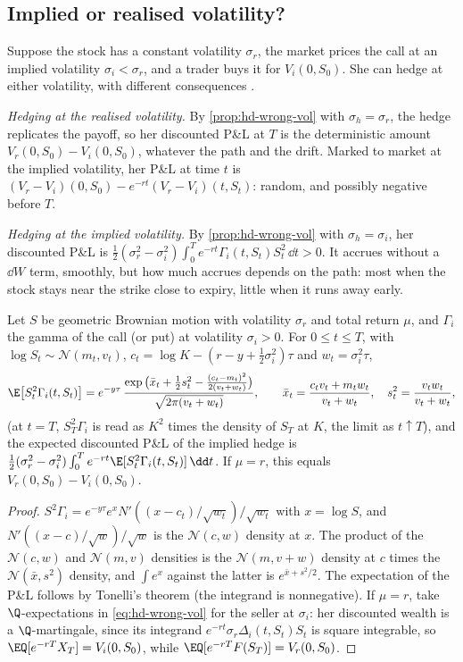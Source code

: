 \subsection{Implied or realised volatility?}\label{sec:hd-implied}

Suppose the stock has a constant volatility $\sigma_r$, the market prices the call at an
implied volatility $\sigma_i<\sigma_r$, and a trader buys it for $V_i(0,S_0)$. She can hedge at either
volatility, with different consequences \citep{ahmad-wilmott-2005}.

\emph{Hedging at the realised volatility.} By \cref{prop:hd-wrong-vol} with $\sigma_h=\sigma_r$, the
hedge replicates the payoff, so her discounted P\&L at $T$ is the deterministic amount
$V_r(0,S_0)-V_i(0,S_0)$, whatever the path and the drift. Marked to market at the implied
volatility, her P\&L at time $t$ is $(V_r-V_i)(0,S_0)-e^{-rt}(V_r-V_i)(t,S_t)$: random, and
possibly negative before $T$.

\emph{Hedging at the implied volatility.} By \cref{prop:hd-wrong-vol} with $\sigma_h=\sigma_i$, her
discounted P\&L is $\frac12(\sigma_r^2-\sigma_i^2)\int_0^Te^{-rt}\Gamma_i(t,S_t)S_t^2\,\dd t>0$. It accrues
without a $\dd W$ term, smoothly, but how much accrues depends on the path: most when the stock
stays near the strike close to expiry, little when it runs away early.

\begin{proposition}\label{prop:hd-implied-mean}
Let $S$ be geometric Brownian motion with volatility $\sigma_r$ and total return $\mu$, and
$\Gamma_i$ the gamma of the call (or put) at volatility $\sigma_i>0$. For $0\le t\le T$, with
$\log S_t\sim\mathcal N(m_t,v_t)$, $c_t=\log K-(r-y+\frac12\sigma_i^2)\tau$ and $w_t=\sigma_i^2\tau$,
\[
  \E\big[S_t^2\Gamma_i(t,S_t)\big]=e^{-y\tau}\,
  \frac{\exp\big(\bar x_t+\frac12s_t^2-\frac{(c_t-m_t)^2}{2(v_t+w_t)}\big)}{\sqrt{2\pi(v_t+w_t)}},\qquad
  \bar x_t=\frac{c_tv_t+m_tw_t}{v_t+w_t},\quad s_t^2=\frac{v_tw_t}{v_t+w_t},
\]
(at $t=T$, $S_T^2\Gamma_i$ is read as $K^2$ times the density of $S_T$ at $K$, the limit as $t\uparrow T$),
and the expected discounted P\&L of the implied hedge is
$\frac12(\sigma_r^2-\sigma_i^2)\int_0^Te^{-rt}\E[S_t^2\Gamma_i(t,S_t)]\,\dd t$. If $\mu=r$, this equals
$V_r(0,S_0)-V_i(0,S_0)$.
\end{proposition}

\begin{proof}
$S^2\Gamma_i=e^{-y\tau}e^x N'((x-c_t)/\sqrt{w_t})/\sqrt{w_t}$ with $x=\log S$, and
$N'((x-c)/\sqrt w)/\sqrt w$ is the $\mathcal N(c,w)$ density at $x$. The product of the
$\mathcal N(c,w)$ and $\mathcal N(m,v)$ densities is the $\mathcal N(m,v+w)$ density at $c$ times the
$\mathcal N(\bar x,s^2)$ density, and $\int e^x$ against the latter is $e^{\bar x+s^2/2}$. The expectation
of the P\&L follows by Tonelli's theorem (the integrand is nonnegative). If $\mu=r$, take
$\Q$-expectations in \eqref{eq:hd-wrong-vol} for the seller at $\sigma_i$: her discounted wealth is a
$\Q$-martingale, since its integrand $e^{-rt}\sigma_r\Delta_i(t,S_t)S_t$ is square integrable, so $\EQ[e^{-rT}X_T]=V_i(0,S_0)$, while
$\EQ[e^{-rT}F(S_T)]=V_r(0,S_0)$.
\end{proof}

